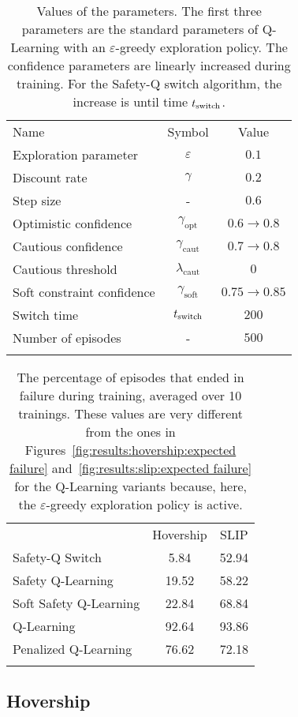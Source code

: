 \begin{table}
	\centering
	\begin{tabular}{l|cc}
		Name & Symbol & Value\\
		\thickhline
		Exploration parameter & $\varepsilon$ & $0.1$\\
		Discount rate & $\gamma$ & $0.2$\\
		Step size & - & $0.6$\\
		Optimistic confidence & $\gamma_\text{opt}$ & $0.6\to0.8$\\
		Cautious confidence & $\gamma_\text{caut}$ & $0.7\to0.8$\\
		Cautious threshold & $\lambda_\text{caut}$ & $0$\\
		Soft constraint confidence & $\gamma_\text{soft}$ & $0.75\to0.85$\\
		Switch time & $t_\text{switch}$ & $200$\\
		Number of episodes & - & $500$\\
		\thickhline
	\end{tabular}
	\caption{Values of the parameters. The first three parameters are the standard parameters of Q-Learning with an $\varepsilon$-greedy exploration policy. The confidence parameters are linearly increased during training. For the Safety-Q switch algorithm, the increase is until time $t_\text{switch}$.}
	\label{tab:parameters}
\end{table}

\begin{table}
	\centering
	\begin{tabular}{l|cc}
			& Hovership & SLIP \\
		\thickhline
		Safety-Q Switch & 5.84 & 52.94\\
		Safety Q-Learning & 19.52 & 58.22\\
		Soft Safety Q-Learning & 22.84 & 68.84\\
		Q-Learning & 92.64 & 93.86\\
		Penalized Q-Learning & 76.62 & 72.18\\
		\thickhline
	\end{tabular}
	\caption{The percentage of episodes that ended in failure during training, averaged over 10 trainings. These values are very different from the ones in Figures~\ref{fig:results:hovership:expected failure} and~\ref{fig:results:slip:expected failure} for the Q-Learning variants because, here, the $\varepsilon$-greedy exploration policy is active.}
	\label{tab:failures exploration}
\end{table}
\subsection{Hovership}


